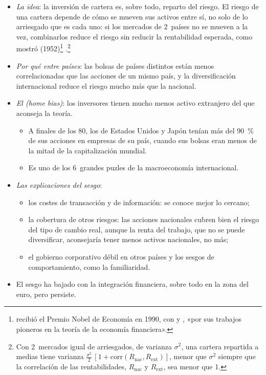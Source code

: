 \documentclass[11pt]{article}
\begin{document}
\begin{itemize}
\item \emph{La idea}: la inversión de cartera es, sobre todo, reparto del riesgo. El riesgo de una cartera depende de cómo se mueven sus activos entre sí, no solo de lo arriesgado que es cada uno: si los mercados de 2~países no se mueven a la vez, combinarlos reduce el riesgo sin reducir la rentabilidad esperada, como mostró  (1952)\nocite{Markowitz1952Portfolio}\footnote{ recibió el Premio Nobel de Economía en 1990, con  y , «por sus trabajos pioneros en la teoría de la economía financiera»\nocite{Nobel1990Markowitz}.} .\footnote{Con 2~mercados igual de arriesgados, de varianza $\sigma^2$, una cartera repartida a medias tiene varianza $\tfrac{\sigma^2}{2}\,[1+\mathrm{corr}(R_{\mathrm{nac}},R_{\mathrm{ext}})]$, menor que $\sigma^2$ siempre que la correlación de las rentabilidades, $R_{\mathrm{nac}}$ y $R_{\mathrm{ext}}$, sea menor que 1.}
\item \emph{Por qué entre países}: las bolsas de países distintos están menos correlacionadas que las acciones de un mismo país, y la diversificación internacional reduce el riesgo mucho más que la nacional\nocite{Grubel1968Diversified,Solnik1974Why}.
\item \emph{El  (\emph{home bias})}: los inversores tienen mucho menos activo extranjero del que aconseja la teoría.
  \begin{itemize}
  \item A finales de los 80, los de Estados Unidos y Japón tenían más del 90~\% de sus acciones en empresas de su país, cuando sus bolsas eran menos de la mitad de la capitalización mundial\nocite{FrenchPoterba1991}.
  \item Es uno de los 6~grandes puzles de la macroeconomía internacional\nocite{ObstfeldRogoff2000Six}.
  \end{itemize}
\item \emph{Las explicaciones del sesgo}\nocite{CoeurdacierRey2013Home}:
  \begin{itemize}
  \item los costes de transacción y de información: se conoce mejor lo cercano;
  \item la cobertura de otros riesgos: las acciones nacionales cubren bien el riesgo del tipo de cambio real, aunque la renta del trabajo, que no se puede diversificar, aconsejaría tener menos activos nacionales, no más\nocite{BaxterJermann1997};
  \item el gobierno corporativo débil en otros países y los sesgos de comportamiento, como la familiaridad.
  \end{itemize}
\item El sesgo ha bajado con la integración financiera, sobre todo en la zona del euro, pero persiste.
\end{itemize}
\end{document}
